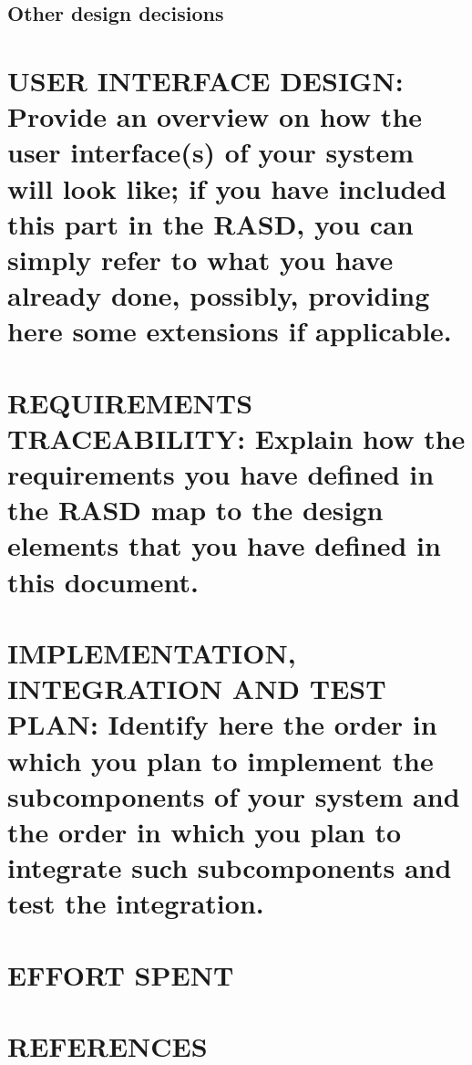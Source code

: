 \documentclass[12pt,a4paper]{article}
\begin{document}
\subsection{Other design decisions}
\section{USER INTERFACE DESIGN: Provide an overview on how the user interface(s) of your system will look like; if you have included this part in the RASD, you can simply refer to what you have
already done, possibly, providing here some extensions if applicable.}
\section{REQUIREMENTS TRACEABILITY: Explain how the requirements you have defined in the RASD map to the design elements that you have defined in this document.}
\section{IMPLEMENTATION, INTEGRATION AND TEST PLAN: Identify here the order in which you plan to implement the subcomponents of your system and the order in which you plan to integrate
such subcomponents and test the integration.}
\section{EFFORT SPENT}
\section{REFERENCES}
\end{document}
